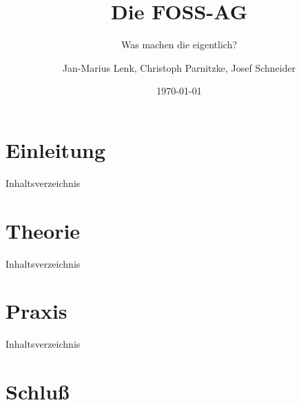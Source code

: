 \documentclass[12pt,utf8]{beamer}
\title{Die FOSS-AG}
\subtitle{Was machen die eigentlich?}
\author[J.-M. Lenk, C. Parnitzke, J. Schneider]{Jan-Marius Lenk, Christoph Parnitzke, Josef Schneider}
\institute[FOSS AG]{Free and Open Source Software AG\\ Fakultät für Informatik}
\date{\today}
\begin{document}
\begin{frame}
	\titlepage
\end{frame}

\section{Einleitung}

\begin{frame}{Inhaltsverzeichnis}
\end{frame}




\section{Theorie}

\begin{frame}{Inhaltsverzeichnis}
\end{frame}




\section{Praxis}

\begin{frame}{Inhaltsverzeichnis}
\end{frame}




\section{Schluß}



\end{document}
